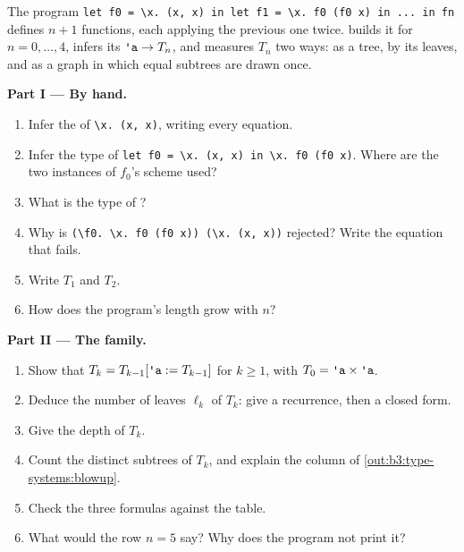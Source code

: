 \begin{problem}\label{pb:b3:type-systems:1}
The program \texttt{let f0 = \textbackslash{}x.\ (x, x) in let f1 = \textbackslash{}x.\ f0 (f0 x) in ...\ in fn} defines $n + 1$ functions, each applying the previous one twice.  builds it for $n = 0, \dots, 4$, infers its  $\text{\ttfamily\textquotesingle a} \to T_n$, and measures $T_n$ two ways: as a tree, by its leaves, and as a graph in which equal subtrees are drawn once.

\label{out:b3:type-systems:blowup}

\medskip\noindent\textbf{Part I --- By hand.}
\begin{enumerate}
\item Infer the  of \texttt{\textbackslash{}x.\ (x, x)}, writing every equation.
\item Infer the type of \texttt{let f0 = \textbackslash{}x.\ (x, x) in \textbackslash{}x.\ f0 (f0 x)}. Where are the two instances of $f_0$'s scheme used?
\item What is the type of ?
\item Why is \texttt{(\textbackslash{}f0.\ \textbackslash{}x.\ f0 (f0 x)) (\textbackslash{}x.\ (x, x))} rejected? Write the equation that fails.
\item Write $T_1$ and $T_2$.
\item How does the program's length grow with $n$?
\end{enumerate}

\medskip\noindent\textbf{Part II --- The family.}
\begin{enumerate}[resume]
\item Show that $T_k = T_{k-1}[\text{\ttfamily\textquotesingle a} := T_{k-1}]$ for $k \ge 1$, with $T_0 = \text{\ttfamily\textquotesingle a} \times \text{\ttfamily\textquotesingle a}$.
\item Deduce the number of leaves $\ell_k$ of $T_k$: give a recurrence, then a closed form.
\item Give the depth of $T_k$.
\item Count the distinct subtrees of $T_k$, and explain the column of \cref{out:b3:type-systems:blowup}.
\item Check the three formulas against the table.
\item What would the row $n = 5$ say? Why does the program not print it?
\end{enumerate}


\end{problem}
